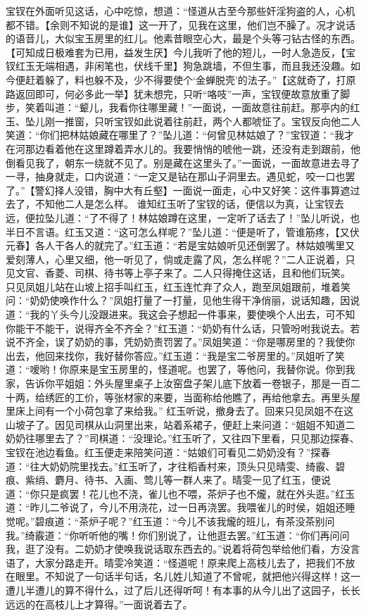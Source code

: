 \documentclass[12pt,oneside]{book}
\begin{document}
宝钗在外面听见这话，心中吃惊，想道：“怪道从古至今那些奸淫狗盗的人，心机都不错。【余则不知说的是谁】这一开了，见我在这里，他们岂不臊了。况才说话的语音儿，大似宝玉房里的红儿。他素昔眼空心大，最是个头等刁钻古怪的东西。【可知成日极难套为已用，益发生厌】今儿我听了他的短儿，一时人急造反，【宝钗红玉无端相遇，非闲笔也，伏线千里】狗急跳墙，不但生事，而且我还没趣。如今便赶着躲了，料也躲不及，少不得要使个‘金蝉脱壳’的法子。”【这就奇了，打原路返回即可，何必多此一举】犹未想完，只听“咯吱”一声，宝钗便故意放重了脚步，笑着叫道：“颦儿，我看你往哪里藏！”一面说，一面故意往前赶。那亭内的红玉、坠儿刚一推窗，只听宝钗如此说着往前赶，两个人都唬怔了。宝钗反向他二人笑道：“你们把林姑娘藏在哪里了？”坠儿道：“何曾见林姑娘了？”宝钗道：“我才在河那边看着他在这里蹲着弄水儿的。我要悄悄的唬他一跳，还没有走到跟前，他倒看见我了，朝东一绕就不见了。别是藏在这里头了。”一面说，一面故意进去寻了一寻，抽身就走，口内说道：“一定又是钻在那山子洞里去。遇见蛇，咬一口也罢了。”【警幻择人没错，胸中大有丘壑】一面说一面走，心中又好笑：这件事算遮过去了，不知他二人是怎么样。
谁知红玉听了宝钗的话，便信以为真，让宝钗去远，便拉坠儿道：“了不得了！林姑娘蹲在这里，一定听了话去了！”坠儿听说，也半日不言语。红玉又道：“这可怎么样呢？”坠儿道：“便是听了，管谁筋疼，【又伏元春】各人干各人的就完了。”红玉道：“若是宝姑娘听见还倒罢了。林姑娘嘴里又爱刻薄人，心里又细，他一听见了，倘或走露了风，怎么样呢？”二人正说着，只见文官、香菱、司棋、待书等上亭子来了。二人只得掩住这话，且和他们玩笑。
只见凤姐儿站在山坡上招手叫红玉，红玉连忙弃了众人，跑至凤姐跟前，堆着笑问：“奶奶使唤作什么？”凤姐打量了一打量，见他生得干净俏丽，说话知趣，因说道：“我的丫头今儿没跟进来。我这会子想起一件事来，要使唤个人出去，可不知你能干不能干，说得齐全不齐全？”红玉道：“奶奶有什么话，只管吩咐我说去。若说不齐全，误了奶奶的事，凭奶奶责罚罢了。”凤姐笑道：“你是哪房里的？我使你出去，他回来找你，我好替你答应。”红玉道：“我是宝二爷房里的。”凤姐听了笑道：“嗳哟！你原来是宝玉房里的，怪道呢。也罢了，等他问，我替你说。你到我家，告诉你平姐姐：外头屋里桌子上汝窑盘子架儿底下放着一卷银子，那是一百二十两，给绣匠的工价，等张材家的来要，当面称给他瞧了，再给他拿去。再里头屋里床上间有一个小荷包拿了来给我。”
红玉听说，撤身去了。回来只见凤姐不在这山坡子了。因见司棋从山洞里出来，站着系裙子，便赶上来问道：“姐姐不知道二奶奶往哪里去了？”司棋道：“没理论。”红玉听了，又往四下里看，只见那边探春、宝钗在池边看鱼。红玉便走来陪笑问道：“姑娘们可看见二奶奶没有？”探春道：“往大奶奶院里找去。”红玉听了，才往稻香村来，顶头只见晴雯、绮霰、碧痕、紫绡、麝月、待书、入画、莺儿等一群人来了。晴雯一见了红玉，便说道：“你只是疯罢！花儿也不浇，雀儿也不喂，茶炉子也不爖，就在外头逛。”红玉道：“昨儿二爷说了，今儿不用浇花，过一日再浇罢。我喂雀儿的时侯，姐姐还睡觉呢。”碧痕道：“茶炉子呢？”红玉道：“今儿不该我爖的班儿，有茶没茶别问我。”绮霰道：“你听听他的嘴！你们别说了，让他逛去罢。”红玉道：“你们再问问我，逛了没有。二奶奶才使唤我说话取东西去的。”说着将荷包举给他们看，方没言语了，大家分路走开。晴雯冷笑道：“怪道呢！原来爬上高枝儿去了，把我们不放在眼里。不知说了一句话半句话，名儿姓儿知道了不曾呢，就把他兴得这样！这一遭儿半遭儿的算不得什么，过了后儿还得听呵！有本事的从今儿出了这园子，长长远远的在高枝儿上才算得。”一面说着去了。
\end{document}
